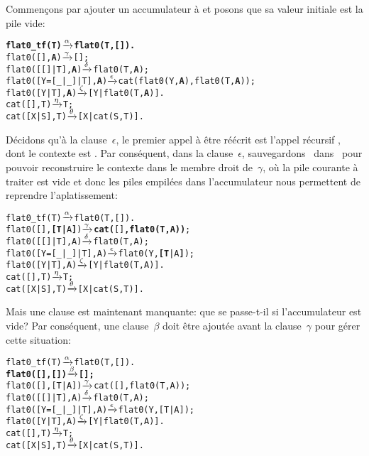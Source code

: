 Commençons par ajouter un accumulateur à  et posons
que sa valeur initiale est la pile vide:
\begin{alltt}
\textbf{flat0\_tf(T)          \(\smashedrightarrow{\alpha}\) flat0(T,[]).}\hfill% \emph{Ajout}
flat0(         [],\textbf{A}) \(\smashedrightarrow{\gamma}\) [];\hfill% A \emph{inutile pour le moment}
flat0(     [[]|T],\textbf{A}) \(\smashedrightarrow{\delta}\) flat0(T,\textbf{A});
flat0([Y=[\_|\_]|T],\textbf{A}) \(\smashedrightarrow{\epsilon}\) cat(flat0(Y,\textbf{A}),flat0(T,\textbf{A}));
flat0(      [Y|T],\textbf{A}) \(\smashedrightarrow{\zeta}\) [Y|flat0(T,\textbf{A})].
cat(   [],T)         \(\smashedrightarrow{\eta}\) T;
cat([X|S],T)         \(\smashedrightarrow{\theta}\) [X|cat(S,T)].
\end{alltt}
Décidons qu'à la clause~\(\epsilon\), le premier appel à être réécrit
est l'appel récursif , dont le
contexte est . Par
conséquent, dans la clause~\(\epsilon\), sauvegardons~
dans~ pour pouvoir reconstruire le contexte dans le membre
droit de~\(\gamma\), où la pile courante à traiter est vide et donc
les piles empilées dans l'accumulateur nous permettent de reprendre
l'aplatissement:
\begin{alltt}
flat0\_tf(T)              \(\smashedrightarrow{\alpha}\) flat0(T,[]).
flat0(         [],\textbf{[T|}A\textbf{]}) \(\smashedrightarrow{\gamma}\) \textbf{cat(}[]\textbf{,flat0(T,A))};\hfill% \emph{Utile}
flat0(     [[]|T],    A) \(\smashedrightarrow{\delta}\) flat0(T,A);
flat0([Y=[\_|\_]|T],    A) \(\smashedrightarrow{\epsilon}\) flat0(Y,\textbf{[T}|A\textbf{]});\hfill% \emph{Empilage}
flat0(      [Y|T],    A) \(\smashedrightarrow{\zeta}\) [Y|flat0(T,A)].
cat(   [],T)             \(\smashedrightarrow{\eta}\) T;
cat([X|S],T)             \(\smashedrightarrow{\theta}\) [X|cat(S,T)].
\end{alltt}
Mais une clause est maintenant manquante: que se passe-t-il si
l'accumulateur est vide? Par conséquent, une clause~\(\beta\) doit
être ajoutée avant la clause~\(\gamma\) pour gérer cette situation:
\begin{alltt}
flat0_tf(T)              \(\smashedrightarrow{\alpha}\) flat0(T,[]).
\textbf{flat0(         [],   []) \(\smashedrightarrow{\beta}\) [];}
flat0(         [],[T|A]) \(\smashedrightarrow{\gamma}\) cat([],flat0(T,A));
flat0(     [[]|T],    A) \(\smashedrightarrow{\delta}\) flat0(T,A);
flat0([Y=[\_|\_]|T],    A) \(\smashedrightarrow{\epsilon}\) flat0(Y,[T|A]);
flat0(      [Y|T],    A) \(\smashedrightarrow{\zeta}\) [Y|flat0(T,A)].
cat(   [],T)             \(\smashedrightarrow{\eta}\) T;
cat([X|S],T)             \(\smashedrightarrow{\theta}\) [X|cat(S,T)].
\end{alltt}
